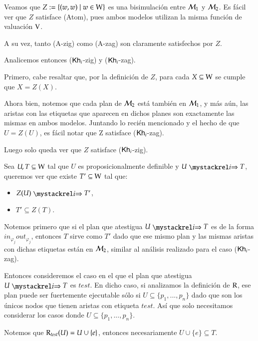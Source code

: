 \begin{demostracion}
\begin{itemize}
    Veamos que $Z := \{(w,w) \mid w \in \mathrm{W} \}$ es una bisimulación entre $\mathcal{M}_1$ y $\mathcal{M}_2$. Es fácil ver que 
    $Z$ satisface (Atom), pues ambos modelos utilizan la misma función de valuación $\mathrm{V}$.

    A su vez, tanto (A-zig) como (A-zag) son claramente satisfechos por $Z$.

    Analicemos entonces ($\mathsf{Kh}_i$-zig) y ($\mathsf{Kh}_i$-zag).

    Primero, cabe resaltar que, por la definición de $Z$, para cada $X \subseteq \mathrm{W}$ se cumple que $X = Z(X)$.

    Ahora bien, notemos que cada plan de $\mathcal{M}_2$ está también en $\mathcal{M}_1$, y más aún, las aristas con las etiquetas 
    que aparecen en dichos planes son exactamente las mismas en ambos modelos. Juntando lo recién mencionado y el hecho de que 
    $U = Z(U)$, es fácil notar que Z satisface ($\mathsf{Kh}_i$-zag).

    Luego solo queda ver que $Z$ satisface ($\mathsf{Kh}_i$-zig).

    Sea $U, T \subseteq \mathrm{W}$ tal que $U$ es proposicionalmente definible y $U \ultsExecAgi T$, queremos ver que existe 
    $T' \subseteq \mathrm{W}$ tal que:

    \begin{multicols}{2}
        \begin{itemize}
            \item $Z(U) \ultsExecAgi T'$, 
            \item $T' \subseteq Z(T)$.
        \end{itemize}
    \end{multicols}

    Notemos primero que si el plan que atestigua $U \ultsExecAgi T$ es de la forma $in_{\varphi_j}out_{\varphi_j}$, 
    entonces $T$ sirve como $T'$ dado que ese mismo plan y las mismas aristas con dichas etiquetas están en $\mathcal{M}_2$, 
    similar al análisis realizado para el caso ($\mathsf{Kh}_i$-zag).

    Entonces consideremos el caso en el que el plan que atestigua $U \ultsExecAgi T$ es $test$. En dicho caso, 
    si analizamos la definición de $\mathrm{R}$, ese plan puede ser fuertemente ejecutable sólo si $U \subseteq \{p_1,...,p_n\}$ 
    dado que son los únicos nodos que tienen aristas con etiqueta $test$. Así que solo necesitamos considerar los casos 
    donde $U \subseteq \{p_1,...,p_n\}$.

    Notemos que $\mathrm{R}_{test}(U) = U \cup \{e\}$, entonces necesariamente $U \cup \{e\} \subseteq T$.


\end{itemize}
\end{demostracion}

